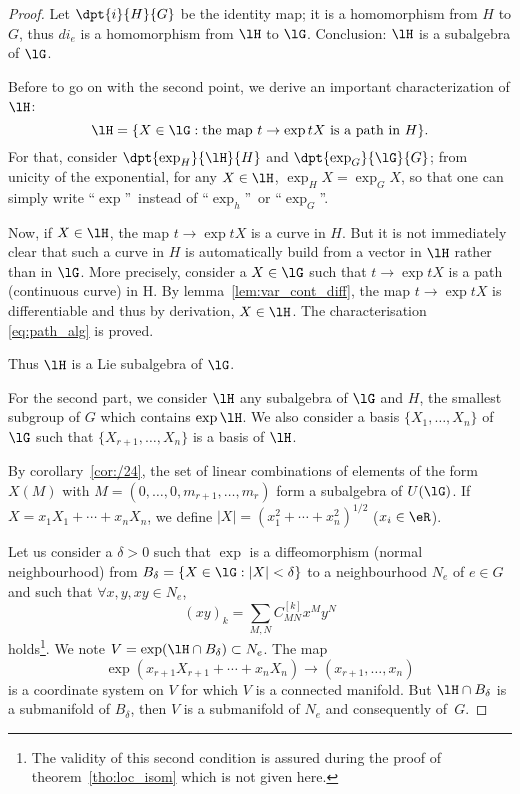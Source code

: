 \begin{proof}

Let $\dpt{i}{H}{G}$ be the identity map; it is a homomorphism from $H$ to $G$, thus $di_e$ is a homomorphism from $\lH$ to $\lG$. Conclusion: $\lH$ is a subalgebra of $\lG$.

Before to go on with the second point, we derive an important characterization of $\lH$:
\begin{equation}\label{eq:path_alg}
\lH=\{X\in\lG:\text{the map } t\to\exp tX\text{ is a path in $H$}\}.
\end{equation}
For that, consider $\dpt{\exp_H}{\lH}{H}$ and $\dpt{\exp_G}{\lG}{G}$; from unicity of the exponential, for any $X\in\lH$, $\exp_HX=\exp_GX$, so that one can simply write ``$\exp$''\ instead of ``$\exp_h$''\ or ``$\exp_G$''.

Now, if $X\in\lH$, the map $t\to\exp tX$ is a curve in $H$. But it is not immediately clear that such a curve in $H$ is automatically build from a vector in $\lH$ rather than in $\lG$.  More precisely, consider a $X\in\lG$ such that $t\to\exp tX$ is a path (continuous curve) in H. By lemma~\ref{lem:var_cont_diff}, the map $t\to\exp tX$ is differentiable and thus by derivation, $X\in\lH$.
The characterisation \eqref{eq:path_alg} is proved.

Thus $\lH$ is a Lie subalgebra of $\lG$.

For the second part, we consider $\lH$ any subalgebra of $\lG$ and $H$, the smallest subgroup of $G$ which contains $\exp\lH$. We also consider a basis $\{X_1,\ldots,X_n\}$ of $\lG$ such that $\{X_{r+1},\ldots,X_n\}$ is a basis of $\lH$.

By corollary~\ref{cor:/24}, the set of linear combinations of elements of the form $X(M)$ with $M=(0,\ldots,0,m_{r+1},\ldots,m_r)$ form a subalgebra of $U(\lG)$. If $X=x_1X_1+\cdots+x_nX_n$, we define $|X|=(x_1^2+\cdots+x_n^2)^{1/2}$ ($x_i\in\eR$).

Let us consider a $\delta>0$ such that $\exp$ is a diffeomorphism (normal neighbourhood) from $B_{\delta}=\{X\in\lG:|X|<\delta\}$ to a neighbourhood $N_e$ of $e\in G$ and such that $\forall x,y,xy\in N_e$,
\begin{equation}\label{eq:coord_xy}
   (xy)_k=\sum_{M,N}C^{[k]}_{MN}x^My^N
\end{equation}
holds\footnote{The validity of this second condition is assured during the proof of theorem~\ref{tho:loc_isom} which is not given here.}. We note $V=\exp(\lH\cap B_{\delta})\subset N_e$. The map
\[
   \exp(x_{r+1}X_{r+1}+\cdots+x_nX_n)\to(x_{r+1},\ldots,x_n)
\]
is a coordinate system on $V$ for which $V$ is a connected manifold. But $\lH\cap B_{\delta}$ is a submanifold of $B_{\delta}$, then $V$ is a submanifold of $N_e$ and consequently of~$G$.


\end{proof}
